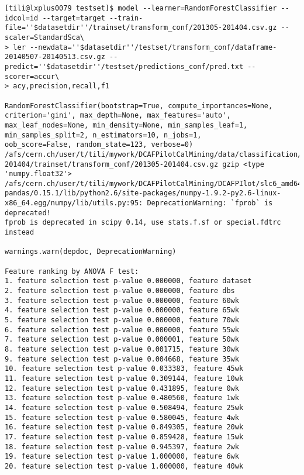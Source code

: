 \begin{verbatim}
[tili@lxplus0079 testset]$ model --learner=RandomForestClassifier --idcol=id --target=target --train-file=''$datasetdir''/trainset/transform_conf/201305-201404.csv.gz --scaler=StandardSca\
> ler --newdata=''$datasetdir''/testset/transform_conf/dataframe-20140507-20140513.csv.gz --predict=''$datasetdir''/testset/predictions_conf/pred.txt --scorer=accur\
> acy,precision,recall,f1

RandomForestClassifier(bootstrap=True, compute_importances=None,
criterion='gini', max_depth=None, max_features='auto',
max_leaf_nodes=None, min_density=None, min_samples_leaf=1,
min_samples_split=2, n_estimators=10, n_jobs=1,
oob_score=False, random_state=123, verbose=0)
/afs/cern.ch/user/t/tili/mywork/DCAFPilotCalMining/data/classification/tier2/merge_conf_tier2_201305-201404/trainset/transform_conf/201305-201404.csv.gz gzip <type 'numpy.float32'>
/afs/cern.ch/user/t/tili/mywork/DCAFPilotCalMining/DCAFPIlot/slc6_amd64_gcc481/external/py2-pandas/0.15.1/lib/python2.6/site-packages/numpy-1.9.2-py2.6-linux-x86_64.egg/numpy/lib/utils.py:95: DeprecationWarning: `fprob` is deprecated!
fprob is deprecated in scipy 0.14, use stats.f.sf or special.fdtrc instead

warnings.warn(depdoc, DeprecationWarning)

Feature ranking by ANOVA F test:
1. feature selection test p-value 0.000000, feature dataset
2. feature selection test p-value 0.000000, feature dbs
3. feature selection test p-value 0.000000, feature 60wk
4. feature selection test p-value 0.000000, feature 65wk
5. feature selection test p-value 0.000000, feature 70wk
6. feature selection test p-value 0.000000, feature 55wk
7. feature selection test p-value 0.000001, feature 50wk
8. feature selection test p-value 0.001715, feature 30wk
9. feature selection test p-value 0.004668, feature 35wk
10. feature selection test p-value 0.033383, feature 45wk
11. feature selection test p-value 0.309144, feature 10wk
12. feature selection test p-value 0.431895, feature 0wk
13. feature selection test p-value 0.480560, feature 1wk
14. feature selection test p-value 0.508494, feature 25wk
15. feature selection test p-value 0.580045, feature 4wk
16. feature selection test p-value 0.849305, feature 20wk
17. feature selection test p-value 0.859428, feature 15wk
18. feature selection test p-value 0.945397, feature 2wk
19. feature selection test p-value 1.000000, feature 6wk
20. feature selection test p-value 1.000000, feature 40wk


\end{verbatim}

